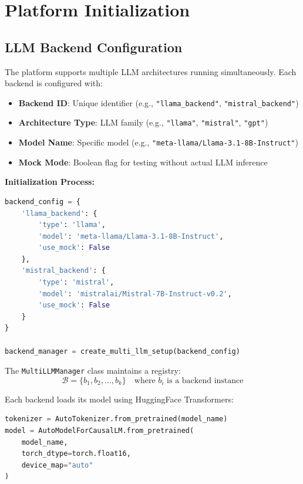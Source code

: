 \documentclass[11pt]{article}
\begin{document}
\section{Platform Initialization}

\subsection{LLM Backend Configuration}

The platform supports multiple LLM architectures running simultaneously. Each backend is configured with:

\begin{itemize}
    \item \textbf{Backend ID}: Unique identifier (e.g., \texttt{"llama\_backend"}, \texttt{"mistral\_backend"})
    \item \textbf{Architecture Type}: LLM family (e.g., \texttt{"llama"}, \texttt{"mistral"}, \texttt{"gpt"})
    \item \textbf{Model Name}: Specific model (e.g., \texttt{"meta-llama/Llama-3.1-8B-Instruct"})
    \item \textbf{Mock Mode}: Boolean flag for testing without actual LLM inference
\end{itemize}

\textbf{Initialization Process:}

\begin{lstlisting}[language=Python, basicstyle=\small\ttfamily]
backend_config = {
    'llama_backend': {
        'type': 'llama',
        'model': 'meta-llama/Llama-3.1-8B-Instruct',
        'use_mock': False
    },
    'mistral_backend': {
        'type': 'mistral',
        'model': 'mistralai/Mistral-7B-Instruct-v0.2',
        'use_mock': False
    }
}

backend_manager = create_multi_llm_setup(backend_config)
\end{lstlisting}

The \texttt{MultiLLMManager} class maintains a registry:
\begin{equation}
\mathcal{B} = \{b_1, b_2, \ldots, b_k\} \quad \text{where } b_i \text{ is a backend instance}
\end{equation}

Each backend loads its model using HuggingFace Transformers:
\begin{lstlisting}[language=Python, basicstyle=\small\ttfamily]
tokenizer = AutoTokenizer.from_pretrained(model_name)
model = AutoModelForCausalLM.from_pretrained(
    model_name,
    torch_dtype=torch.float16,
    device_map="auto"
)
\end{lstlisting}
\end{document}
